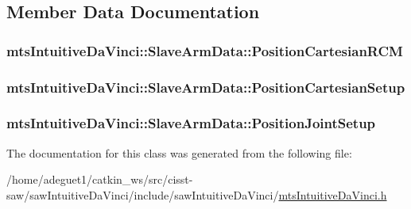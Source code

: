 \subsection{Member Data Documentation}
\hypertarget{classmts_intuitive_da_vinci_1_1_slave_arm_data_acbcd39e3197437403efb86bf908adbd5}{
\subsubsection[{Position\-Cartesian\-R\-C\-M}]{ mts\-Intuitive\-Da\-Vinci\-::\-Slave\-Arm\-Data\-::\-Position\-Cartesian\-R\-C\-M}}\label{classmts_intuitive_da_vinci_1_1_slave_arm_data_acbcd39e3197437403efb86bf908adbd5}
\hypertarget{classmts_intuitive_da_vinci_1_1_slave_arm_data_a09a328a245e9ccf2d482941fba0c76bc}{
\subsubsection[{Position\-Cartesian\-Setup}]{ mts\-Intuitive\-Da\-Vinci\-::\-Slave\-Arm\-Data\-::\-Position\-Cartesian\-Setup}}\label{classmts_intuitive_da_vinci_1_1_slave_arm_data_a09a328a245e9ccf2d482941fba0c76bc}
\hypertarget{classmts_intuitive_da_vinci_1_1_slave_arm_data_a9510d583a4decfbd25c027bf7c1e3e15}{
\subsubsection[{Position\-Joint\-Setup}]{ mts\-Intuitive\-Da\-Vinci\-::\-Slave\-Arm\-Data\-::\-Position\-Joint\-Setup}}\label{classmts_intuitive_da_vinci_1_1_slave_arm_data_a9510d583a4decfbd25c027bf7c1e3e15}


The documentation for this class was generated from the following file\-:\begin{DoxyCompactItemize}
\item 
/home/adeguet1/catkin\-\_\-ws/src/cisst-\/saw/saw\-Intuitive\-Da\-Vinci/include/saw\-Intuitive\-Da\-Vinci/\hyperlink{mts_intuitive_da_vinci_8h}{mts\-Intuitive\-Da\-Vinci.\-h}\end{DoxyCompactItemize}
